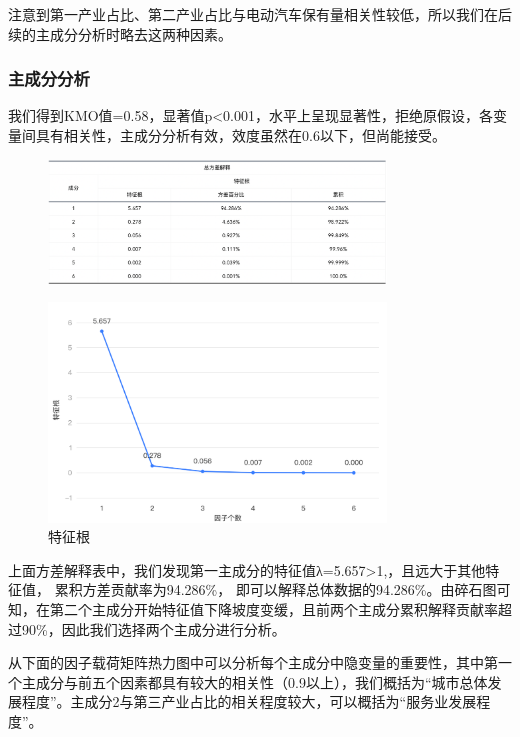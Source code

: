 \documentclass[12pt, a4paper, oneside]{ctexart}
\begin{document}
注意到第一产业占比、第二产业占比与电动汽车保有量相关性较低，所以我们在后续的主成分分析时略去这两种因素。
\subsubsection{主成分分析}
我们得到KMO值=0.58，显著值p<0.001，水平上呈现显著性，拒绝原假设，各变量间具有相关性，主成分分析有效，效度虽然在0.6以下，但尚能接受。
\begin{figure}[h]
    \centering
    \includegraphics[width=0.8\textwidth]{pic/KMO.png}
    \label{fig:方差解释表}
\end{figure}
\begin{figure}[h]
    \centering
    \includegraphics[width=0.8\textwidth]{pic/特征根.png}
    \caption{特征根}
    \label{fig:特征根}
\end{figure}

上面方差解释表中，我们发现第一主成分的特征值λ=5.657>1,，且远大于其他特征值， 累积方差贡献率为94.286\%， 即可以解释总体数据的94.286\%。由碎石图可知，在第二个主成分开始特征值下降坡度变缓，且前两个主成分累积解释贡献率超过90\%，因此我们选择两个主成分进行分析。

从下面的因子载荷矩阵热力图中可以分析每个主成分中隐变量的重要性，其中第一个主成分与前五个因素都具有较大的相关性（0.9以上），我们概括为“城市总体发展程度”。主成分2与第三产业占比的相关程度较大，可以概括为“服务业发展程度”。
\end{document}
